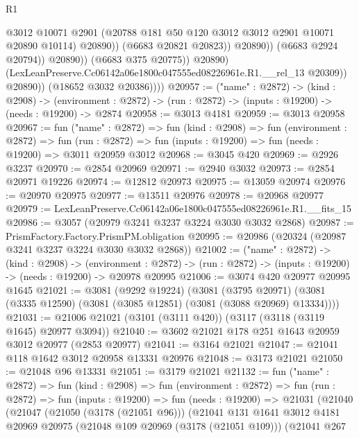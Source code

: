 \begin{lexlean}{R1}
\begin{coremodule}
                                    @3012
                                    @10071
                                    @2901
                                    (@20788 @181 @50 @120 @3012 @3012 @2901 @10071 @20890 @10114)
                                    @20890))
                                (@6683 @20821 @20823))
                              @20890))
                          (@6683 @2924 @20794))
                        @20890))
                    (@6683 @375 @20775))
                  @20890)
                (LexLeanPreserve.Cc06142a06e1800c047555ed08226961e.R1.__rel_13 @20309))
              @20890))
          (@18652 @3032 @20386))))
@20957 := ("name" : @2872) ->
  (kind : @2908) ->
  (environment : @2872) -> (run : @2872) -> (inputs : @19200) -> (needs : @19200) -> @2874
@20958 := @3013 @4181
@20959 := @3013 @20958
@20967 := fun ("name" : @2872) =>
  fun (kind : @2908) =>
  fun (environment : @2872) =>
  fun (run : @2872) => fun (inputs : @19200) => fun (needs : @19200) => @3011 @20959 @3012
@20968 := @3045 @420
@20969 := @2926 @3237
@20970 := @2854 @20969
@20971 := @2940 @3032
@20973 := @2854 @20971 @19226
@20974 := @12812 @20973
@20975 := @13059 @20974
@20976 := @20970 @20975
@20977 := @13511 @20976
@20978 := @20968 @20977
@20979 := LexLeanPreserve.Cc06142a06e1800c047555ed08226961e.R1.__fits_15
@20986 := @3057 (@20979 @3241 @3237 @3224 @3030 @3032 @2868)
@20987 := PrismFactory.Factory.PrismPM.obligation
@20995 := @20986 (@20324 (@20987 @3241 @3237 @3224 @3030 @3032 @2868))
@21002 := ("name" : @2872) ->
  (kind : @2908) ->
  (environment : @2872) -> (run : @2872) -> (inputs : @19200) -> (needs : @19200) -> @20978 @20995
@21006 := @3074 @420 @20977 @20995 @1645
@21021 := @3081
    (@9292 @19224)
    (@3081
      (@3795 @20971)
      (@3081 (@3335 @12590) (@3081 (@3085 @12851) (@3081 (@3088 @20969) @13334))))
@21031 := @21006 @21021 (@3101 (@3111 @420)) (@3117 (@3118 (@3119 @1645) @20977 @3094))
@21040 := @3602 @21021 @178 @251 @1643 @20959 @3012 @20977 (@2853 @20977)
@21041 := @3164 @21021
@21047 := @21041 @118 @1642 @3012 @20958 @13331 @20976
@21048 := @3173 @21021
@21050 := @21048 @96 @13331
@21051 := @3179 @21021
@21132 := fun ("name" : @2872) =>
  fun (kind : @2908) =>
  fun (environment : @2872) =>
  fun (run : @2872) =>
  fun (inputs : @19200) =>
  fun (needs : @19200) =>
  @21031
    (@21040
      (@21047
        (@21050 (@3178 (@21051 @96)))
        (@21041
          @131
          @1641
          @3012
          @4181
          @20969
          @20975
          (@21048 @109 @20969 (@3178 (@21051 @109)))
          (@21041
            @267

\end{coremodule}
\end{lexlean}

